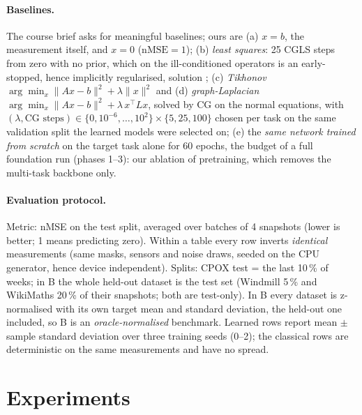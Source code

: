 \documentclass{article}
\newcommand{\nmse}{\mathrm{nMSE}}
\begin{document}
\paragraph{Baselines.} The course brief asks for meaningful baselines; ours are
(a) $x = b$, the measurement itself, and $x = 0$ ($\nmse = 1$);
(b) \emph{least squares}: 25 CGLS steps from zero with no prior, which on the ill-conditioned operators is an
early-stopped, hence implicitly regularised, solution \citep{hansen1998rank};
(c) \emph{Tikhonov} $\arg\min_x \|Ax - b\|^{2} + \lambda \|x\|^{2}$ and
(d) \emph{graph-Laplacian} $\arg\min_x \|Ax - b\|^{2} + \lambda\, x^{\top} L x$, solved by CG on the normal
equations, with $(\lambda, \text{CG steps}) \in \{0, 10^{-6}, \dots, 10^{2}\} \times \{5, 25, 100\}$
chosen per task on the same validation split the learned models were selected on;
(e) the \emph{same network trained from scratch} on the target task alone for 60 epochs, the budget of a
full foundation run (phases 1--3): our ablation of pretraining, which removes the multi-task backbone only.

\paragraph{Evaluation protocol.} Metric: nMSE on the test split, averaged over batches of 4 snapshots
(lower is better; 1 means predicting zero). Within a table every row inverts \emph{identical} measurements
(same masks, sensors and noise draws, seeded on the CPU generator, hence device independent). Splits: CPOX
test = the last 10\,\% of weeks; in B the whole held-out dataset is the test set (Windmill 5\,\% and
WikiMaths 20\,\% of their snapshots; both are test-only). In B every dataset is z-normalised with its own
target mean and standard deviation, the held-out one included, so B is an \emph{oracle-normalised} benchmark.
Learned rows report mean $\pm$ sample standard deviation over three training seeds (0--2); the classical rows
are deterministic on the same measurements and have no spread.

\section{Experiments}
\end{document}
